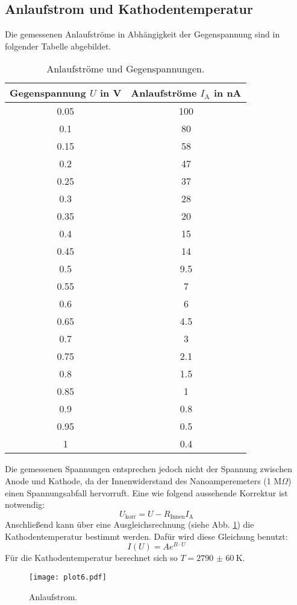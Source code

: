 \subsection{Anlaufstrom und Kathodentemperatur}
\label{sec:anlauf}

Die gemessenen Anlaufströme in Abhängigkeit der Gegenspannung sind in folgender Tabelle abgebildet.
\begin{table}
\centering
\caption{Anlaufströme und Gegenspannungen.}
\label{tab:c}
\begin{tabular}{c c}
\toprule
Gegenspannung $U$ in V & Anlaufströme $I_\text{A}$ in nA \\
\midrule
0.05 & 100 \\
0.1  & 80  \\
0.15 & 58  \\
0.2  & 47  \\
0.25 & 37  \\
0.3  & 28  \\
0.35 & 20  \\
0.4  & 15  \\
0.45 & 14  \\
0.5  & 9.5 \\
0.55 & 7   \\
0.6  & 6   \\
0.65 & 4.5 \\
0.7  & 3   \\
0.75 & 2.1 \\
0.8  & 1.5 \\
0.85 & 1   \\
0.9  & 0.8 \\
0.95 & 0.5 \\
1    & 0.4 \\
\bottomrule
\end{tabular}
\end{table}
Die gemessenen Spannungen entsprechen jedoch nicht der Spannung zwischen Anode und Kathode, da der Innenwiderstand des Nanoamperemeters (1 M$\Omega$) einen Spannungsabfall hervorruft.
Eine wie folgend aussehende Korrektur ist notwendig:
\begin{equation*}
  U_\text{korr} = U - R_\text{Innen} I_\text{A}
\end{equation*}
Anschließend kann über eine Ausgleichsrechnung (siehe Abb. \ref{fig:plot6}) die Kathodentemperatur bestimmt werden.
Dafür wird diese Gleichung benutzt:
\begin{equation}
  I(U) = A e^{B \cdot U}
\end{equation}
Für die Kathodentemperatur berechnet sich so $T = \SI{2790(60)}{\kelvin}$.
\begin{figure}
  \centering
  \texttt{[image: plot6.pdf]}
  \caption{Anlaufstrom.}
  \label{fig:plot6}
\end{figure}

